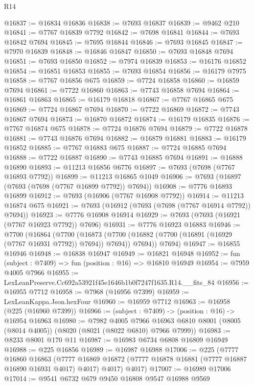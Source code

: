 \begin{lexlean}{R14}
\begin{coremodule}
@16837 := @16834 @16836
@16838 := @7693 @16837
@16839 := @9462 @210
@16841 := @7767 @16839 @7792
@16842 := @7698 @16841
@16844 := @7693 @16842 @7694
@16845 := @7695 @16844
@16846 := @7693 @16845
@16847 := @7970 @16839
@16848 := @16846 @16847
@16850 := @7693 @16848 @7694
@16851 := @7693 @16850
@16852 := @7974 @16839
@16853 := @16176 @16852
@16854 := @16851 @16853
@16855 := @7693 @16854
@16856 := @16179 @7975
@16858 := @7767 @16856 @675
@16859 := @7724 @16858
@16860 := @16859 @7694
@16861 := @7722 @16860
@16863 := @7743 @16858 @7694
@16864 := @16861 @16863
@16865 := @16179 @16818
@16867 := @7767 @16865 @675
@16869 := @7724 @16867 @7694
@16870 := @7722 @16869
@16872 := @7743 @16867 @7694
@16873 := @16870 @16872
@16874 := @16179 @16835
@16876 := @7767 @16874 @675
@16878 := @7724 @16876 @7694
@16879 := @7722 @16878
@16881 := @7743 @16876 @7694
@16882 := @16879 @16881
@16883 := @16179 @16852
@16885 := @7767 @16883 @675
@16887 := @7724 @16885 @7694
@16888 := @7722 @16887
@16890 := @7743 @16885 @7694
@16891 := @16888 @16890
@16893 := @11213 @16856 @6776
@16897 := @7693 (@7698 (@7767 @16893 @7792))
@16899 := @11213 @16865 @1049
@16906 := @7693 (@16897 (@7693 (@7698 (@7767 @16899 @7792)) @7694))
@16908 := @7776 @16893 @16899
@16912 := @7693 (@16906 (@7767 @16908 @7792))
@16914 := @11213 @16874 @675
@16921 := @7693 (@16912 (@7693 (@7698 (@7767 @16914 @7792)) @7694))
@16923 := @7776 @16908 @16914
@16929 := @7693 (@7693 (@16921 (@7767 @16923 @7792)) @7696)
@16931 := @7776 @16923 @16883
@16946 := @7700
    (@16864
      (@7700
        (@16873 (@7700 (@16882 (@7700 (@16891 (@16929 (@7767 @16931 @7792)) @7694)) @7694)) @7694))
      @7694)
@16947 := @16855 @16946
@16948 := @16838 @16947
@16949 := @16821 @16948
@16952 := fun (subject : @7409) => fun (position : @16) => @16810 @16949
@16954 := @7959 @4005 @7966
@16955 := LexLeanPreserve.Cc692a53921f45e1646b1b0f7247f1635.R14.__fits_84
@16956 := @16955 @7712
@16958 := @7968 (@16956 @7399)
@16959 := LexLeanKappa.Json.hexFour
@16960 := @16959 @7712
@16963 := @16958 (@225 (@16960 @7399))
@16966 := (subject : @7409) -> (position : @16) -> @16954 @16963
@16980 := @7982
    @4005
    @7966
    @16963
    @6810
    @8001
    (@8005 (@8014 @4005))
    (@8020 (@8021 (@8022 @6810) @7966 @7999))
@16983 := @8233 @8001 @170 @11
@16987 := @16983 @6734 @6808 @16809 @16949
@16988 := @225 @16856
@16989 := @16987 @16988
@17006 := @225
    (@7777
      @16860
      @16863
      (@7777 @16869 @16872 (@7777 @16878 @16881 (@7777 @16887 @16890 @16931 @4017) @4017) @4017)
      @4017)
@17007 := @16989 @17006
@17014 := @9541 @6732 @679 @9450 @16808 @9547 @16988 @9569

\end{coremodule}
\end{lexlean}
